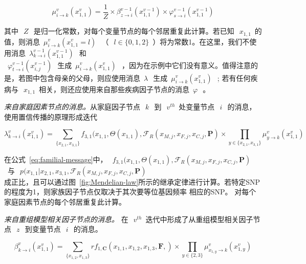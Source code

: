 \begin{equation}\label{eq:variable-message}
\mu_{i \rightarrow k}^v(x_{1,1}^v)= \frac{1}{Z} \times
\beta_{z \rightarrow i}^{v-1}(x_{1,1}^{v-1}) \times
\varphi_{s \rightarrow i}^{v-1}(x_{1,1}^{v-1})
\end{equation}

其中~$~Z~$~是归一化常数，对每个变量节点的每个邻居重复此计算。若已知~$~x_{1,1}$~的值，则消息~$\mu_{i \rightarrow k}^v(x_{1,1}^v =l)~$~（~$~l\in \{0,1,2\}$~）将为常数1。在这里，我们不使用消息~$\lambda_{k \rightarrow i}^{v-1}(x_{1,1}^{v-1})~$~和\\ ~$\varphi_{t \rightarrow i}^{v-1}(x_{i,j}^{v-1})~$~生成~$\mu_{i \rightarrow k}^v(x_{1,1}^v)~$~，因为在示例中它们没有意义。值得注意的是，若图中包含母亲的父母，则应使用消息~$\lambda~$~生成~$\mu_{i \rightarrow k}^v(x_{1,1}^v)~$~; 若有任何疾病与~$~x_{1,1}$~相关，则还应使用来自那些疾病因子节点的消息~$\varphi~$~。

\emph{来自家庭因素节点的消息。}从家庭因子节点~$~k~$~到~$~v^{th}$~处变量节点~$~i~$~的消息，使用置信传播的原理形成迭代

\begin{equation}
\label{eq:familial-message}
\lambda_{k \rightarrow i}^v(x_{1,1}^v) =  \sum_{\{x_{2,1},x_{3,1}\}}f_{3,1}(x_{1,1},\Theta(x_{1,1}),\mathcal{F}_{R}(x_{M,j},x_{F,j}, x_{C,j},\mathbf{P}) 
\times \prod_{y\in \{x_{2,1},x_{3,1}\}} \mu_{y \rightarrow k}^v(x_{1,1}^v)
\end{equation}

在公式~\ref{eq:familial-message}中，~$~f_{3,1}(x_{1,1},\Theta(x_{1,1}),\mathcal{F}_{R}(x_{M,j},x_{F,j}, x_{C,j},\mathbf{P})~$~与~$~p(x_{1,1}| x_{2,1},x_{3,1},\mathcal{F}_{R}(x_{M,j},x_{F,j}, x_{C,j},\mathbf{P})~$\\成正比，且可以通过图~\ref{fig:Mendelian-law}所示的继承定律进行计算。若特定SNP的程度为1，则家族因子节点仅取决于其次要等位基因频率 相应的SNP。 对每个家庭因素节点的每个邻居重复此计算。


\emph{来自重组模型相关因子节点的消息。} 在~$~v^{th}$~迭代中形成了从重组模型相关因子节点~$~z~$~到变量节点~$~i~$~的消息。

\begin{equation}\label{eq:relavtes-information}
\beta_{k \rightarrow i}^v(x_{1,1}^v) = \sum_{\{x_{1,2},x_{1,3}\}}rf_{1,\mathbf{C}}(x_{1,1},x_{1,2},x_{1,3},\mathbf{F},) \times  \prod_{y \in \{2,3\}} \mu_{x_{1,y} \rightarrow k}^v(x_{1,y}^v)
\end{equation}

